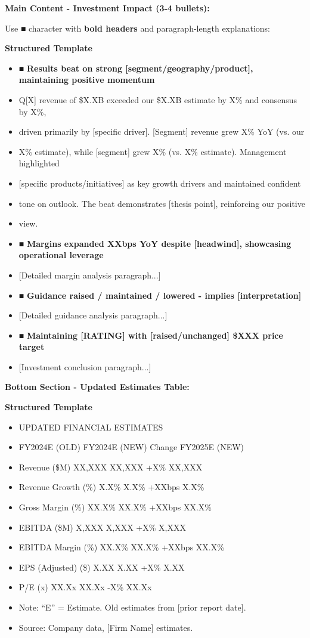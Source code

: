 \documentclass[11pt]{article}
\begin{document}
\textbf{Main Content - Investment Impact (3-4 bullets):}


Use ■ character with \textbf{bold headers} and paragraph-length explanations:


\textbf{Structured Template}
\begin{itemize}[leftmargin=*,itemsep=2pt,topsep=2pt]
\item {} ■ \textbf{Results beat on strong [segment/geography/product], maintaining positive momentum}
\item {} Q[X] revenue of \$X.XB exceeded our \$X.XB estimate by X\% and consensus by X\%,
\item {} driven primarily by [specific driver]. [Segment] revenue grew X\% YoY (vs. our
\item {} X\% estimate), while [segment] grew X\% (vs. X\% estimate). Management highlighted
\item {} [specific products/initiatives] as key growth drivers and maintained confident
\item {} tone on outlook. The beat demonstrates [thesis point], reinforcing our positive
\item {} view.
\item {} ■ \textbf{Margins expanded XXbps YoY despite [headwind], showcasing operational leverage}
\item {} [Detailed margin analysis paragraph...]
\item {} ■ \textbf{Guidance raised / maintained / lowered - implies [interpretation]}
\item {} [Detailed guidance analysis paragraph...]
\item {} ■ \textbf{Maintaining [RATING] with [raised/unchanged] \$XXX price target}
\item {} [Investment conclusion paragraph...]
\end{itemize}

\textbf{Bottom Section - Updated Estimates Table:}


\textbf{Structured Template}
\begin{itemize}[leftmargin=*,itemsep=2pt,topsep=2pt]
\item {} UPDATED FINANCIAL ESTIMATES
\item {} FY2024E (OLD) FY2024E (NEW) Change FY2025E (NEW)
\item {} Revenue (\$M) XX,XXX XX,XXX +X\% XX,XXX
\item {} Revenue Growth (\%) X.X\% X.X\% +XXbps X.X\%
\item {} Gross Margin (\%) XX.X\% XX.X\% +XXbps XX.X\%
\item {} EBITDA (\$M) X,XXX X,XXX +X\% X,XXX
\item {} EBITDA Margin (\%) XX.X\% XX.X\% +XXbps XX.X\%
\item {} EPS (Adjusted) (\$) X.XX X.XX +X\% X.XX
\item {} P/E (x) XX.Xx XX.Xx -X\% XX.Xx
\item {} Note: ``E'' = Estimate. Old estimates from [prior report date].
\item {} Source: Company data, [Firm Name] estimates.
\end{itemize}
\end{document}
